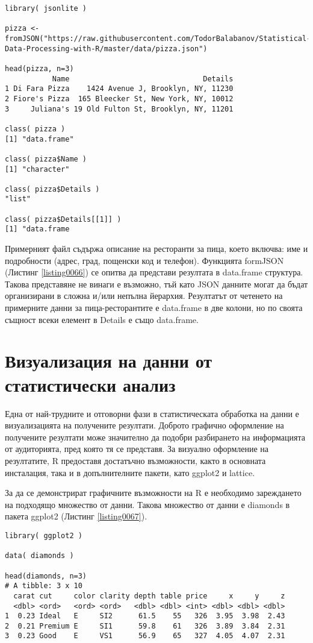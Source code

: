\begin{lstlisting}[caption=Четене на JSON данни, label=listing0066]
library( jsonlite )
 
pizza <- fromJSON("https://raw.githubusercontent.com/TodorBalabanov/Statistical-Data-Processing-with-R/master/data/pizza.json")

head(pizza, n=3)
           Name                               Details
1 Di Fara Pizza    1424 Avenue J, Brooklyn, NY, 11230
2 Fiore's Pizza  165 Bleecker St, New York, NY, 10012
3     Juliana's 19 Old Fulton St, Brooklyn, NY, 11201

class( pizza )
[1] "data.frame"
 
class( pizza$Name )
[1] "character"
 
class( pizza$Details )
"list"

class( pizza$Details[[1]] )
[1] "data.frame
\end{lstlisting}

Примерният файл съдържа описание на ресторанти за пица, което включва: име и подробности (адрес, град, пощенски код и телефон). Функцията formJSON (Листинг \ref{listing0066}) се опитва да представи резултата в data.frame структура. Такова представяне не винаги е възможно, тъй като JSON данните могат да бъдат организирани в сложна и/или непълна йерархия. Резултатът от четенето на примерните данни за пица-ресторантите е data.frame в две колони, но по своята същност всеки елемент в Details е също data.frame.

\section{Визуализация на данни от статистически анализ}

Една от най-трудните и отговорни фази в статистическата обработка на данни е визуализацията на получените резултати. Доброто графично оформление на получените резултати може значително да подобри разбирането на информацията от аудиторията, пред която тя се представя. За визуално оформление на резултатите, R предоставя достатъчно възможности, както в основната инсталация, така и в допълнителните пакети, като ggplot2 и lattice.

За да се демонстрират графичните възможности на R е необходимо зареждането на подходящо множество от данни. Такова множество от данни е diamonds в пакета ggplot2 (Листинг \ref{listing0067}).

\begin{lstlisting}[caption=Четене на JSON данни, label=listing0067]
library( ggplot2 )

data( diamonds )
 
head(diamonds, n=3)
# A tibble: 3 x 10
  carat cut     color clarity depth table price     x     y     z
  <dbl> <ord>   <ord> <ord>   <dbl> <dbl> <int> <dbl> <dbl> <dbl>
1  0.23 Ideal   E     SI2      61.5    55   326  3.95  3.98  2.43
2  0.21 Premium E     SI1      59.8    61   326  3.89  3.84  2.31
3  0.23 Good    E     VS1      56.9    65   327  4.05  4.07  2.31
\end{lstlisting}

